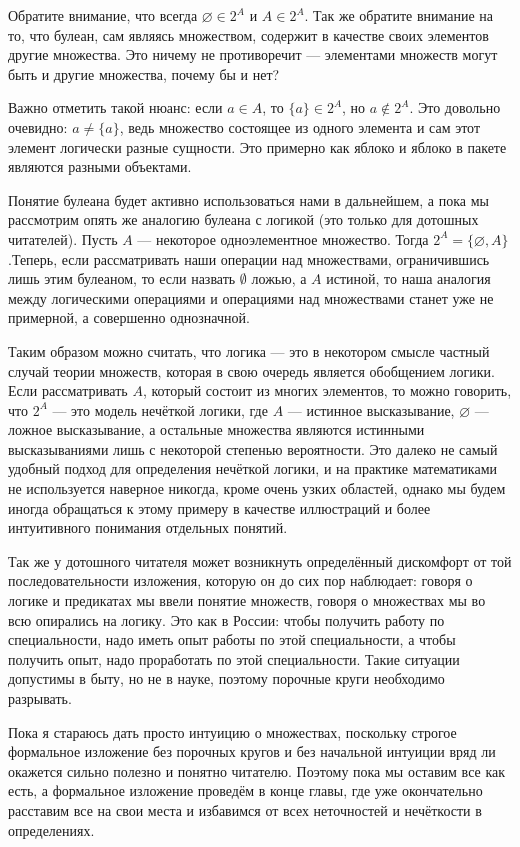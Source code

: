 Обратите внимание, что всегда $\varnothing \in 2^A$ и $A\in 2^A$. Так же обратите внимание на то, что булеан, сам являясь множеством, содержит в качестве своих элементов другие множества. Это ничему не противоречит — элементами множеств могут быть и другие множества, почему бы и нет?

Важно отметить такой нюанс: если $a \in A$, то $\{a\} \in 2^A$, но $a \not \in 2^A$. Это довольно очевидно: $a\not = \{a\}$, ведь множество состоящее из одного элемента и сам этот элемент логически разные сущности. Это примерно как яблоко и яблоко в пакете являются разными объектами.

Понятие булеана будет активно использоваться нами в дальнейшем, а пока мы рассмотрим опять же аналогию булеана с логикой (это только для дотошных читателей). Пусть $A$ — некоторое одноэлементное множество. Тогда $2^A = \{\varnothing, A\}$.Теперь, если рассматривать наши операции над множествами, ограничившись лишь этим булеаном, то если назвать $\emptyset$ ложью, а $A$ истиной, то наша аналогия между логическими операциями и операциями над множествами станет уже не примерной, а совершенно однозначной.

Таким образом можно считать, что логика — это в некотором смысле частный случай теории множеств, которая в свою очередь является обобщением логики. Если рассматривать $A$, который состоит из многих элементов, то можно говорить, что $2^A$ — это модель нечёткой логики, где $A$ — истинное высказывание, $\varnothing$ — ложное высказывание, а остальные множества являются истинными высказываниями лишь с некоторой степенью вероятности. Это далеко не самый удобный подход для определения нечёткой логики, и на практике математиками не используется наверное никогда, кроме очень узких областей, однако мы будем иногда обращаться к этому примеру в качестве иллюстраций и более интуитивного понимания отдельных понятий.

Так же у дотошного читателя может возникнуть определённый дискомфорт от той последовательности изложения, которую он до сих пор наблюдает: говоря о логике и предикатах мы ввели понятие множеств, говоря о множествах мы во всю опирались на логику. Это как в России: чтобы получить работу по специальности, надо иметь опыт работы по этой специальности, а чтобы получить опыт, надо проработать по этой специальности. Такие ситуации допустимы в быту, но не в науке, поэтому порочные круги необходимо разрывать.

Пока я стараюсь дать просто интуицию о множествах, поскольку строгое формальное изложение без порочных кругов и без начальной интуиции вряд ли окажется сильно полезно и понятно читателю. Поэтому пока мы оставим все как есть, а формальное изложение проведём в конце главы, где уже окончательно расставим все на свои места и избавимся от всех неточностей и нечёткости в определениях.
